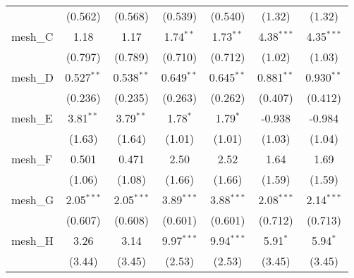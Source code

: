 \begin{tabular}{lcccccc}
                                                               & (0.562)        & (0.568)        & (0.539)       & (0.540)       & (1.32)         & (1.32)\\   
   mesh\_C                                                     & 1.18           & 1.17           & 1.74$^{**}$   & 1.73$^{**}$   & 4.38$^{***}$   & 4.35$^{***}$\\   
                                                               & (0.797)        & (0.789)        & (0.710)       & (0.712)       & (1.02)         & (1.03)\\   
   mesh\_D                                                     & 0.527$^{**}$   & 0.538$^{**}$   & 0.649$^{**}$  & 0.645$^{**}$  & 0.881$^{**}$   & 0.930$^{**}$\\   
                                                               & (0.236)        & (0.235)        & (0.263)       & (0.262)       & (0.407)        & (0.412)\\   
   mesh\_E                                                     & 3.81$^{**}$    & 3.79$^{**}$    & 1.78$^{*}$    & 1.79$^{*}$    & -0.938         & -0.984\\   
                                                               & (1.63)         & (1.64)         & (1.01)        & (1.01)        & (1.03)         & (1.04)\\   
   mesh\_F                                                     & 0.501          & 0.471          & 2.50          & 2.52          & 1.64           & 1.69\\   
                                                               & (1.06)         & (1.08)         & (1.66)        & (1.66)        & (1.59)         & (1.59)\\   
   mesh\_G                                                     & 2.05$^{***}$   & 2.05$^{***}$   & 3.89$^{***}$  & 3.88$^{***}$  & 2.08$^{***}$   & 2.14$^{***}$\\   
                                                               & (0.607)        & (0.608)        & (0.601)       & (0.601)       & (0.712)        & (0.713)\\   
   mesh\_H                                                     & 3.26           & 3.14           & 9.97$^{***}$  & 9.94$^{***}$  & 5.91$^{*}$     & 5.94$^{*}$\\   
                                                               & (3.44)         & (3.45)         & (2.53)        & (2.53)        & (3.45)         & (3.45)\\   

\end{tabular}

